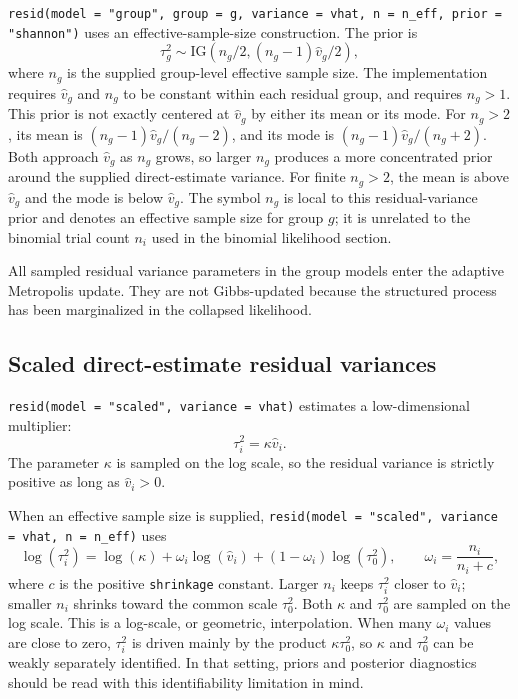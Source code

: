 \documentclass[11pt]{article}
\begin{document}
\texttt{resid(model = "group", group = g, variance = vhat, n = n\_eff, prior = "shannon")} uses an effective-sample-size construction. The prior is
\begin{equation}
  \tau_g^2 \sim \mathrm{IG}\left(n_g/2,
      (n_g-1)\widehat v_g/2\right),
\end{equation}
where $n_g$ is the supplied group-level effective sample size. The implementation requires $\widehat v_g$ and $n_g$ to be constant within each residual group, and requires $n_g>1$. This prior is not exactly centered at $\widehat v_g$ by either its mean or its mode. For $n_g>2$, its mean is $(n_g-1)\widehat v_g/(n_g-2)$, and its mode is $(n_g-1)\widehat v_g/(n_g+2)$. Both approach $\widehat v_g$ as $n_g$ grows, so larger $n_g$ produces a more concentrated prior around the supplied direct-estimate variance. For finite $n_g>2$, the mean is above $\widehat v_g$ and the mode is below $\widehat v_g$. The symbol $n_g$ is local to this residual-variance prior and denotes an effective sample size for group $g$; it is unrelated to the binomial trial count $n_i$ used in the binomial likelihood section.

All sampled residual variance parameters in the group models enter the adaptive Metropolis update. They are not Gibbs-updated because the structured process has been marginalized in the collapsed likelihood.

\subsection{Scaled direct-estimate residual variances}

\texttt{resid(model = "scaled", variance = vhat)} estimates a low-dimensional multiplier:
\begin{equation}
  \tau_i^2 = \kappa \widehat v_i.
\end{equation}
The parameter $\kappa$ is sampled on the log scale, so the residual variance is strictly positive as long as $\widehat v_i>0$.

When an effective sample size is supplied, \texttt{resid(model = "scaled", variance = vhat, n = n\_eff)} uses
\begin{equation}
  \log(\tau_i^2) =
    \log(\kappa) + \omega_i \log(\widehat v_i) +
    (1-\omega_i)\log(\tau_0^2),
  \qquad
  \omega_i = \frac{n_i}{n_i + c},
\end{equation}
where $c$ is the positive \texttt{shrinkage} constant. Larger $n_i$ keeps $\tau_i^2$ closer to $\widehat v_i$; smaller $n_i$ shrinks toward the common scale $\tau_0^2$. Both $\kappa$ and $\tau_0^2$ are sampled on the log scale. This is a log-scale, or geometric, interpolation. When many $\omega_i$ values are close to zero, $\tau_i^2$ is driven mainly by the product $\kappa\tau_0^2$, so $\kappa$ and $\tau_0^2$ can be weakly separately identified. In that setting, priors and posterior diagnostics should be read with this identifiability limitation in mind.
\end{document}
